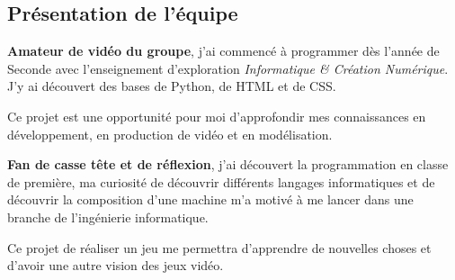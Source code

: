 \documentclass[12pt]{article}
\begin{document}
        \subsection{Présentation de l'équipe}
        \hfill
            \begin{tcolorbox} [
                coltitle=black, 
                colframe=blue!20!white, 
                colback=blue!5, 
                title=\subsubsection{Raphaël "Noton" Heng (Chef de projet)}
            ]
                
                \setlength{\parindent}{3ex} 
                \textbf{Amateur de vidéo du groupe}, j'ai commencé à programmer dès l'année de Seconde avec l'enseignement d'exploration \textit{Informatique \& Création Numérique}. J'y ai découvert des bases de Python, de HTML et de CSS. 
                \\
                \par Ce projet est une opportunité pour moi d'approfondir mes connaissances en développement, en production de vidéo et en modélisation.
            \end{tcolorbox}
            \begin{tcolorbox} [
                coltitle=black, 
                colframe=green!40!white, 
                colback=green!5, 
                title= \subsubsection{Alexandre "Zeflash" Privat (Responsable scénario)}
            ]

            \setlength{\parindent}{3ex} \textbf{Fan de casse tête et de réflexion}, j'ai découvert la programmation en classe de première, ma curiosité de découvrir différents langages informatiques et de découvrir la composition d'une machine m'a motivé à me lancer dans une branche de l'ingénierie informatique.
            \\
            \par Ce projet de réaliser un jeu me permettra d'apprendre de nouvelles choses et d'avoir une autre vision des jeux vidéo.
            
            \end{tcolorbox}
            
\end{document}
